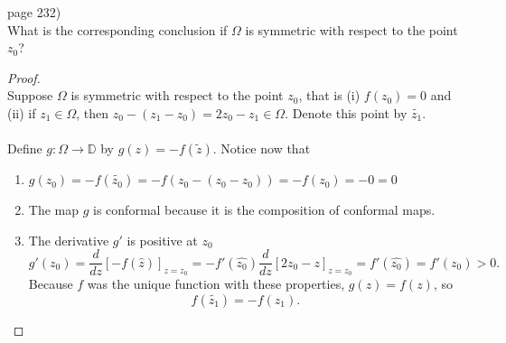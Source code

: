 \documentclass{article}
\newenvironment{problem}[2][Problem]{\begin{trivlist}
\item[\hskip \labelsep {\bfseries #1}\hskip \labelsep {\bfseries #2.}]}{\end{trivlist}}
\begin{document}
\begin{problem}{2} (page 232) \\
  What is the corresponding conclusion if $\Omega$ is symmetric with respect to
  the point $z_0$?
\end{problem}
\begin{proof} \text{} \\
  Suppose $\Omega$ is symmetric with respect to the point $z_0$, that is
    (i) $f(z_0) = 0$ and
    (ii) if $z_1 \in \Omega$, then $z_0 - (z_1 - z_0) = 2z_0 - z_1 \in \Omega$.
  Denote this point by $\widetilde{z_1}$.
  \\~\\
  Define $g\colon \Omega \rightarrow \mathbb{D}$ by $g(z) = -f(\tilde{z})$.
  Notice now that \begin{enumerate}
    \item $g(z_0) = -f(\widetilde{z_0}) = -f(z_0 - (z_0 - z_0)) = -f(z_0) = -0 = 0$
    \item The map $g$ is conformal because it is the composition of conformal maps.
    \item The derivative $g'$ is positive at $z_0$ \[
      g'(z_0)
        = \frac{d}{dz}\left[-f(\hat{z})\right]_{z = z_0}
        = -f'(\hat{z_0})\frac{d}{dz}\left[2z_0 - z\right]_{z = z_0}
        = f'(\hat{z_0})
        = f'(z_0)
        > 0.
    \]
    Because $f$ was the unique function with these properties, $g(z) = f(z)$, so
    \[
      f(\widetilde{z_1}) = -f(z_1).
    \]
  \end{enumerate}
\end{proof}
\end{document}
